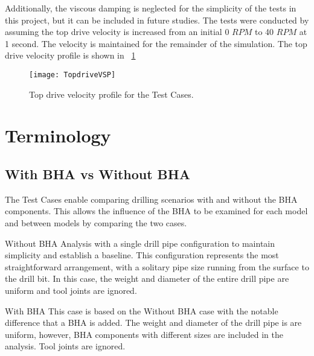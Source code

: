 Additionally, the viscous damping is neglected for the simplicity of the tests in this project, but it can be included in future studies.  The tests were conducted by assuming the top drive velocity is increased from an initial 0 $RPM$ to 40 $RPM$ at 1 second. The velocity is maintained for the remainder of the simulation. The top drive velocity profile is shown in \figurename~\ref{figure_topdrive_VSP}
\begin{figure}
  \centering
  \texttt{[image: TopdriveVSP]}
  \caption[Top drive velocity profile for the Test Cases]{Top drive velocity profile for the Test Cases.}\label{figure_topdrive_VSP}
\end{figure}

\section{Terminology}
\subsection{With BHA vs Without BHA}
The Test Cases enable comparing drilling scenarios with and without the BHA components. This allows the influence of the BHA to be examined for each model and between models by comparing the two cases.

\begin{definition}{Without BHA}
Analysis with a single drill pipe configuration to maintain simplicity and establish a baseline. This configuration represents the most straightforward arrangement, with a solitary pipe size running from the surface to the drill bit. In this case, the weight and diameter of the entire drill pipe are uniform and tool joints are ignored.
\end{definition}
\begin{definition}{With BHA}
This case is based on the Without BHA case with the notable difference that a BHA is added.  The weight and diameter of the drill pipe is are uniform, however, BHA components with different sizes are included in the analysis.  Tool joints are ignored.
\end{definition}



